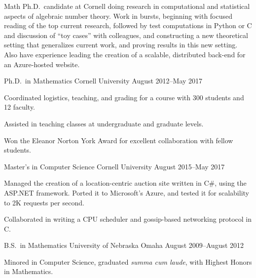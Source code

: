 \documentclass[11pt, letterpaper]{awesome-cv}
\begin{document}
\makecvheader





\begin{cvparagraph}

Math Ph.D.~candidate at Cornell doing research in computational and statistical aspects of algebraic number theory. Work in bursts, beginning with focused reading of the top current research, followed by test computations in Python or C and discussion of ``toy cases'' with colleagues, and constructing a new theoretical setting that generalizes current work, and proving results in this new setting. Also have experience leading the creation of a scalable, distributed back-end for an Azure-hosted website.
\end{cvparagraph}






\begin{cventries}

\cventry
	{Ph.D.~in Mathematics}
	{Cornell University}
	{}
	{August 2012--May 2017}
	{
		\begin{cvitems}
			\item{Coordinated logistics, teaching, and grading for a course with 300 students and 12 faculty.}
			\item{Assisted in teaching classes at undergraduate and graduate levels.}
			\item{Won the Eleanor Norton York Award for excellent collaboration with fellow students.}
		\end{cvitems}
	}
	
\cventry
	{Master's in Computer Science}
	{Cornell University}
	{}
	{August 2015--May 2017}
	{
		\begin{cvitems}
			\item{Managed the creation of a location-centric auction site written in C\#, using the ASP.NET framework. Ported it to Microsoft's Azure, and tested it for scalability to 2K requests per second.}
			\item{Collaborated in writing a CPU scheduler and gossip-based networking protocol in C.}
		\end{cvitems}
	}
	
\cventry
	{B.S.~in Mathematics}
	{University of Nebraska Omaha}
	{}
	{August 2009--August 2012}
	{
		\begin{cvitems}
			\item{Minored in Computer Science, graduated \emph{summa cum laude}, with Highest Honors in Mathematics.}
		\end{cvitems}
	}
	
\end{cventries}
\end{document}
